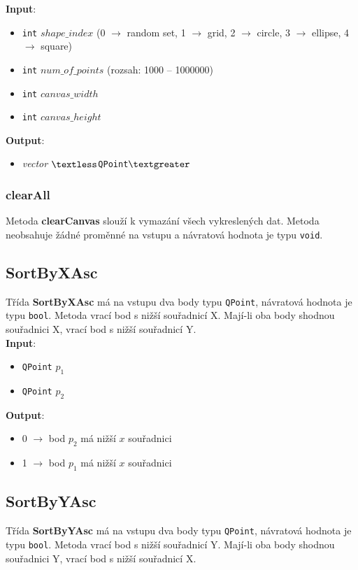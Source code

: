 \documentclass[a4paper, 12pt]{article}
\begin{document}
\textbf{Input}:
\begin{itemize}
\item \texttt{int} $shape\_index$ (0 $\rightarrow$ random set, 1 $\rightarrow$ grid, 2 $\rightarrow$ circle, 3 $\rightarrow$ ellipse, 4 $\rightarrow$ square)
\item \texttt{int} $num\_of\_points$ (rozsah: 1000 – 1000000)
\item \texttt{int} $canvas\_width$
\item \texttt{int} $canvas\_height$
\end{itemize}

\textbf{Output}:
\begin{itemize}
\item \textsl{vector} $\textless$\texttt{QPoint}$\textgreater$
\end{itemize}

\subsubsection*{clearAll}
Metoda \textbf{clearCanvas} slouží k vymazání všech vykreslených dat. Metoda neobsahuje žádné proměnné na vstupu a návratová hodnota je typu \texttt{void}.

\subsection{SortByXAsc}
Třída \textbf{SortByXAsc} má na vstupu dva body typu \texttt{QPoint}, návratová hodnota je typu \texttt{bool}. Metoda vrací bod s nižší  souřadnicí X. Mají-li oba body shodnou souřadnici X, vrací bod s nižší souřadnicí Y.\\

\textbf{Input}:
\begin{itemize}
\item \texttt{QPoint} $p_1$
\item \texttt{QPoint} $p_2$
\end{itemize}

\textbf{Output}:
\begin{itemize}
\item 0 $\rightarrow$ bod $p_2$ má nižší $x$ souřadnici
\item 1 $\rightarrow$ bod $p_1$ má nižší $x$ souřadnici
\end{itemize}

\subsection{SortByYAsc}
Třída \textbf{SortByYAsc} má na vstupu dva body typu \texttt{QPoint}, návratová hodnota je typu \texttt{bool}. Metoda vrací bod s nižší  souřadnicí Y. Mají-li oba body shodnou souřadnici Y, vrací bod s nižší souřadnicí X.\\
\end{document}
